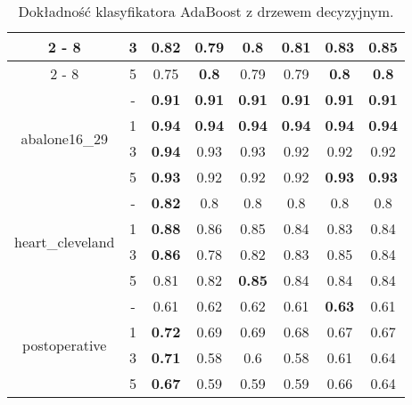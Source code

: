 \begin{table}[H]
\begin{center}
{\begin{tabular}{c|c|cccccc}
\cline{2%
	-%
	8}%
&3&0.82&0.79&0.8&0.81&0.83&\textbf{0.85}\\%
\cline{2%
	-%
	8}%
&5&0.75&\textbf{0.8}&0.79&0.79&\textbf{0.8}&\textbf{0.8}\\%
\hline%
\multirow{4}{*}{abalone16\_29}&{-}&\textbf{0.91}&\textbf{0.91}&\textbf{0.91}&\textbf{0.91}&\textbf{0.91}&\textbf{0.91}\\%
\cline{2%
	-%
	8}%
&1&\textbf{0.94}&\textbf{0.94}&\textbf{0.94}&\textbf{0.94}&\textbf{0.94}&\textbf{0.94}\\%
\cline{2%
	-%
	8}%
&3&\textbf{0.94}&0.93&0.93&0.92&0.92&0.92\\%
\cline{2%
	-%
	8}%
&5&\textbf{0.93}&0.92&0.92&0.92&\textbf{0.93}&\textbf{0.93}\\%
\hline%
\multirow{4}{*}{heart\_cleveland}&{-}&\textbf{0.82}&0.8&0.8&0.8&0.8&0.8\\%
\cline{2%
	-%
	8}%
&1&\textbf{0.88}&0.86&0.85&0.84&0.83&0.84\\%
\cline{2%
	-%
	8}%
&3&\textbf{0.86}&0.78&0.82&0.83&0.85&0.84\\%
\cline{2%
	-%
	8}%
&5&0.81&0.82&\textbf{0.85}&0.84&0.84&0.84\\%
\hline%
\multirow{4}{*}{postoperative}&{-}&0.61&0.62&0.62&0.61&\textbf{0.63}&0.61\\%
\cline{2%
	-%
	8}%
&1&\textbf{0.72}&0.69&0.69&0.68&0.67&0.67\\%
\cline{2%
	-%
	8}%
&3&\textbf{0.71}&0.58&0.6&0.58&0.61&0.64\\%
\cline{2%
	-%
	8}%
&5&\textbf{0.67}&0.59&0.59&0.59&0.66&0.64\\%
\hline%
\end{tabular}}
			\caption{Dokładność klasyfikatora AdaBoost z drzewem decyzyjnym.}
			\label{adaboostdrzewo}
		\end{center}
\end{table}
